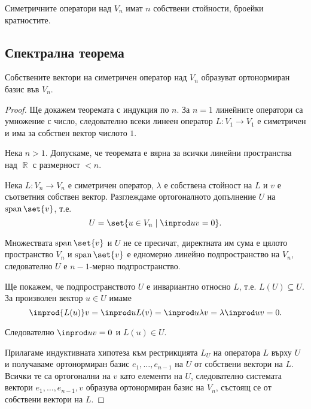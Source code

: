 \documentclass{../../common/topic}
\begin{document}
\begin{corollary}
  Симетричните оператори над \( V_n \) имат \( n \) собствени стойности, броейки кратностите.
\end{corollary}

\subsection{Спектрална теорема}

\begin{theorem}
  Собствените вектори на симетричен оператор над \( V_n \) образуват ортонормиран базис във \( V_n \).
\end{theorem}
\begin{proof}
  Ще докажем теоремата с индукция по \( n \). За \( n = 1 \) линейните оператори са умножение с число, следователно всеки линеен оператор \( L: V_1 \to V_1 \) е симетричен и има за собствен вектор числото \( 1 \).

  Нека \( n > 1 \). Допускаме, че теоремата е вярна за всички линейни пространства над \( \BbbR \) с размерност \( < n \).

  Нека \( L: V_n \to V_n \) е симетричен оператор, \( \lambda \) е собствена стойност на \( L \) и \( v \) е съответния собствен вектор. Разглеждаме ортогоналното допълнение \( U \) на \( \linspan \set{ v } \), т.е.
  \begin{equation*}
    U = \set{ u \in V_n \mid \inprod u v = 0 }.
  \end{equation*}

  Множествата \( \linspan \set{ v } \) и \( U \) не се пресичат, директната им сума е цялото пространство \( V_n \) и \( \linspan \set{ v } \) е едномерно линейно подпространство на \( V_n \), следователно \( U \) е \( n-1 \)-мерно подпространство.

  Ще покажем, че подпространството \( U \) е инвариантно относно \( L \), т.е. \( L(U) \subseteq U \). За произволен вектор \( u \in U \) имаме
  \begin{equation*}
    \inprod {L(u)} v
    =
    \inprod u {L(v)}
    =
    \inprod u {\lambda v}
    =
    \lambda \inprod u v
    =
    0.
  \end{equation*}

  Следователно \( \inprod u v = 0 \) и \( L(u) \in U \).

  Прилагаме индуктивната хипотеза към рестрикцията \( L_U \) на оператора \( L \) върху \( U \) и получаваме ортонормиран базис \( e_1, \ldots, e_{n-1} \) на \( U \) от собствени вектори на \( L \). Всички те са ортогонални на \( v \) като елементи на \( U \), следователно системата вектори \( e_1, \ldots, e_{n-1}, v \) образува ортонормиран базис на \( V_n \), състоящ се от собствени вектори на \( L \).
\end{proof}
\end{document}
